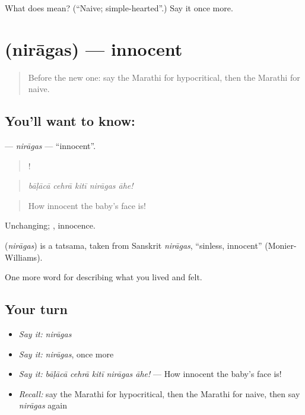 \begin{tcolorbox}[breakable,colback=teal!4,colframe=teal!35!black,title={Before you move on}]
What does  mean? (\textquotedblleft{}Naive; simple-hearted\textquotedblright{}.) Say it once more.
\end{tcolorbox}
\section[\texorpdfstring{\mr{निरागस} (nirāgas)}{निरागस (nirāgas)}]{ (nirāgas) — innocent}

\label{lesson:MR-C470-niragas}



\begin{quote}
Before the new one: say the Marathi for hypocritical, then the Marathi for naive.
\end{quote}

\subsection*{You'll want to know: }
\textbf{} — \emph{nirāgas} — \textquotedblleft{}innocent\textquotedblright{}.

\begin{quote}
    !
\end{quote}

\begin{quote}
\emph{bāḷācā cehrā kitī nirāgas āhe!}
\end{quote}

\begin{quote}
How innocent the baby's face is!
\end{quote}

Unchanging; , innocence.

\begin{cousinweb}
\textbf{} (\emph{nirāgas}) is a tatsama, taken from Sanskrit \emph{nirāgas}, \textquotedblleft{}sinless, innocent\textquotedblright{} (Monier-Williams).
\end{cousinweb}

\begin{grammarlens}[title={What you've built}]
One more word for describing what you lived and felt.
\end{grammarlens}

\subsection*{Your turn}
\begin{itemize}
\raggedright
  \item \emph{Say it:} \emph{nirāgas}
  \item \emph{Say it:} \emph{nirāgas}, once more
  \item \emph{Say it:} \emph{bāḷācā cehrā kitī nirāgas āhe!} — How innocent the baby's face is!
  \item \emph{Recall:} say the Marathi for hypocritical, then the Marathi for naive, then say \emph{nirāgas} again
\end{itemize}

